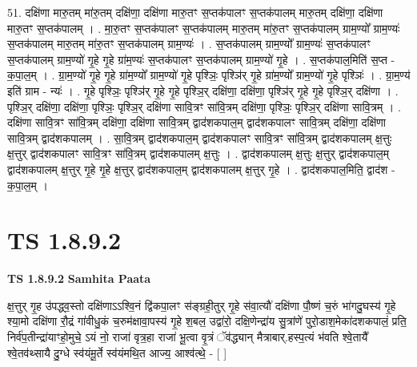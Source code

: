 \documentclass[17pt]{extarticle}
\begin{document}
51. दक्षि॑णा मारु॒तम् मा॑रु॒तम् दक्षि॑णा॒ दक्षि॑णा मारु॒तꣳ स॒प्तक॑पालꣳ स॒प्तक॑पालम् मारु॒तम् दक्षि॑णा॒ दक्षि॑णा मारु॒तꣳ स॒प्तक॑पालम् । . मा॒रु॒तꣳ स॒प्तक॑पालꣳ स॒प्तक॑पालम् मारु॒तम् मा॑रु॒तꣳ स॒प्तक॑पालम् ग्राम॒ण्यो᳚ ग्राम॒ण्यः॑ स॒प्तक॑पालम् मारु॒तम् मा॑रु॒तꣳ स॒प्तक॑पालम् ग्राम॒ण्यः॑ । . स॒प्तक॑पालम् ग्राम॒ण्यो᳚ ग्राम॒ण्यः॑ स॒प्तक॑पालꣳ स॒प्तक॑पालम् ग्राम॒ण्यो॑ गृ॒हे गृ॒हे ग्रा॑म॒ण्यः॑ स॒प्तक॑पालꣳ स॒प्तक॑पालम् ग्राम॒ण्यो॑ गृ॒हे । . स॒प्तक॑पाल॒मिति॑ स॒प्त - क॒पा॒ल॒म् । . ग्रा॒म॒ण्यो॑ गृ॒हे गृ॒हे ग्रा॑म॒ण्यो᳚ ग्राम॒ण्यो॑ गृ॒हे पृश्ञिः॒ पृश्ञि॑र् गृ॒हे ग्रा॑म॒ण्यो᳚ ग्राम॒ण्यो॑ गृ॒हे पृश्ञिः॑ । . ग्रा॒म॒ण्य॑ इति॑ ग्राम - न्यः॑ । . गृ॒हे पृश्ञिः॒ पृश्ञि॑र् गृ॒हे गृ॒हे पृश्ञि॒र् दक्षि॑णा॒ दक्षि॑णा॒ पृश्ञि॑र् गृ॒हे गृ॒हे पृश्ञि॒र् दक्षि॑णा । . पृश्ञि॒र् दक्षि॑णा॒ दक्षि॑णा॒ पृश्ञिः॒ पृश्ञि॒र् दक्षि॑णा सावि॒त्रꣳ सा॑वि॒त्रम् दक्षि॑णा॒ पृश्ञिः॒ पृश्ञि॒र् दक्षि॑णा सावि॒त्रम् । . दक्षि॑णा सावि॒त्रꣳ सा॑वि॒त्रम् दक्षि॑णा॒ दक्षि॑णा सावि॒त्रम् द्वाद॑शकपाल॒म् द्वाद॑शकपालꣳ सावि॒त्रम् दक्षि॑णा॒ दक्षि॑णा सावि॒त्रम् द्वाद॑शकपालम् । . सा॒वि॒त्रम् द्वाद॑शकपाल॒म् द्वाद॑शकपालꣳ सावि॒त्रꣳ सा॑वि॒त्रम् द्वाद॑शकपालम् क्ष॒त्तुः क्ष॒त्तुर् द्वाद॑शकपालꣳ सावि॒त्रꣳ सा॑वि॒त्रम् द्वाद॑शकपालम् क्ष॒त्तुः । . द्वाद॑शकपालम् क्ष॒त्तुः क्ष॒त्तुर् द्वाद॑शकपाल॒म् द्वाद॑शकपालम् क्ष॒त्तुर् गृ॒हे गृ॒हे क्ष॒त्तुर् द्वाद॑शकपाल॒म् द्वाद॑शकपालम् क्ष॒त्तुर् गृ॒हे । . द्वाद॑शकपाल॒मिति॒ द्वाद॑श - क॒पा॒ल॒म् । \newline
\pagebreak
{}
\section*{ TS 1.8.9.2 }

\textbf{TS 1.8.9.2 } \newline
\textbf{Samhita Paata} \newline

क्ष॒त्तुर् गृ॒ह उ॑पद्ध्व॒स्तो दक्षि॑णाऽऽश्वि॒नं द्वि॑कपा॒लꣳ स॑ङ्ग्रही॒तुर् गृ॒हे स॑वा॒त्यौ॑ दक्षि॑णा पौ॒ष्णं च॒रुं भा॑गदु॒घस्य॑ गृ॒हे श्या॒मो दक्षि॑णा रौ॒द्रं गा॑वीधु॒कं च॒रुम॑क्षावा॒पस्य॑ गृ॒हे श॒बल॒ उद्वा॑रो॒ दक्षि॒णेन्द्रा॑य सु॒त्रांणे॑ पुरो॒डाश॒मेका॑दशकपालं॒ प्रति॒ निर्व॑प॒तीन्द्रा॑याꣳहो॒मुचे॒ ऽयं नो॒ राजा॑ वृत्र॒हा राजा॑ भू॒त्वा वृ॒त्रं ॅव॑द्ध्यान् मैत्राबार्.हस्प॒त्यं भ॑वति श्वे॒तायै᳚ श्वे॒तव॑थ्सायै दु॒ग्धे स्व॑यंमू॒र्ते स्व॑यंमथि॒त आज्य॒ आश्व॑त्थे॒ - [ ] \newline
\end{document}
